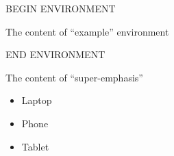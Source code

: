 \documentclass{article}
\newenvironment{example}
    {
    BEGIN ENVIRONMENT

    }
    {

    END ENVIRONMENT
    }
\newenvironment{super-emphasis}
    {
    \bfseries
    \color{red}
    \begin{LARGE}
    }
    {
    \end{LARGE}
    }
\begin{document}
\begin{example}
    The content of ``example'' environment
\end{example}


\vspace{5mm}


\begin{super-emphasis}
    The content of ``super-emphasis''
    \begin{itemize}
        \item Laptop
        \item Phone
        \item Tablet
    \end{itemize}
\end{super-emphasis}


\vspace{5mm}
\end{document}
